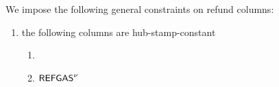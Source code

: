 We impose the following general constraints on refund columns:
\begin{enumerate}
        \item the following columns are hub-stamp-constant
		\begin{multicols}{2}
			\begin{enumerate}
				\item {}
				\item $\textsf{REFGAS}^{\nu}$
			\end{enumerate}
		\end{multicols}
\end{enumerate}
